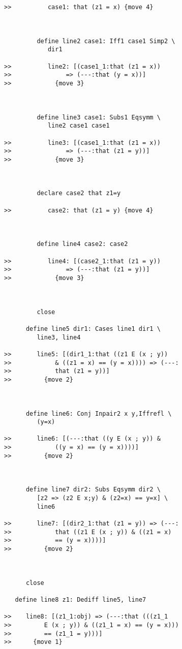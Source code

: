 \documentclass[12pt]{article}
\begin{document}
\begin{verbatim}
>>          case1: that (z1 = x) {move 4}



         define line2 case1: Iff1 case1 Simp2 \
            dir1

>>          line2: [(case1_1:that (z1 = x))
>>               => (---:that (y = x))]
>>            {move 3}



         define line3 case1: Subs1 Eqsymm \
            line2 case1 case1

>>          line3: [(case1_1:that (z1 = x))
>>               => (---:that (z1 = y))]
>>            {move 3}



         declare case2 that z1=y

>>          case2: that (z1 = y) {move 4}



         define line4 case2: case2

>>          line4: [(case2_1:that (z1 = y))
>>               => (---:that (z1 = y))]
>>            {move 3}



         close

      define line5 dir1: Cases line1 dir1 \
         line3, line4

>>       line5: [(dir1_1:that ((z1 E (x ; y))
>>            & ((z1 = x) == (y = x)))) => (---:
>>            that (z1 = y))]
>>         {move 2}



      define line6: Conj Inpair2 x y,Iffrefl \
         (y=x)

>>       line6: [(---:that ((y E (x ; y)) &
>>            ((y = x) == (y = x))))]
>>         {move 2}



      define line7 dir2: Subs Eqsymm dir2 \
         [z2 => (z2 E x;y) & (z2=x) == y=x] \
         line6

>>       line7: [(dir2_1:that (z1 = y)) => (---:
>>            that ((z1 E (x ; y)) & ((z1 = x)
>>            == (y = x))))]
>>         {move 2}



      close

   define line8 z1: Dediff line5, line7

>>    line8: [(z1_1:obj) => (---:that (((z1_1
>>         E (x ; y)) & ((z1_1 = x) == (y = x)))
>>         == (z1_1 = y)))]
>>      {move 1}




\end{verbatim}
\end{document}
